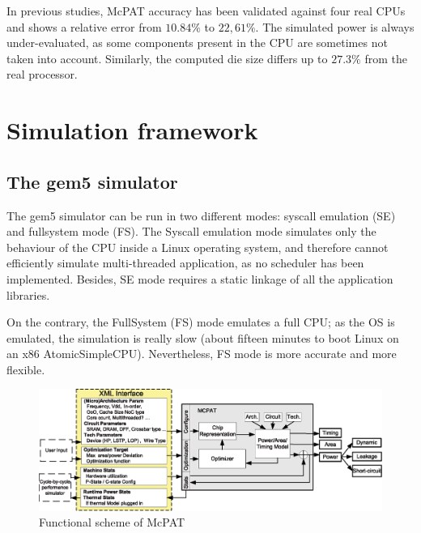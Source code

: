 \documentclass{article}
\begin{document}
\begin{multicols}{2}
In previous studies, McPAT accuracy has been validated against four real CPUs\cite{McPAT} and shows a relative error from $10.84\%$ to $22,61\%$. The simulated power is always under-evaluated, as some components present in the CPU are sometimes not taken into account. Similarly, the computed die size differs up to $27.3\%$ from the real processor.



\section{Simulation framework}
\label{sim}

\subsection{The gem5 simulator}

The gem5 simulator can be run in two different modes: syscall emulation (SE) and fullsystem mode (FS). The Syscall emulation mode simulates only the behaviour of the CPU inside a Linux operating system, and therefore cannot efficiently simulate multi-threaded application, as no scheduler has been implemented. Besides, SE mode requires a static linkage of all the application libraries.

On the contrary, the FullSystem (FS) mode emulates a full CPU; as the OS is emulated, the simulation is really slow (about fifteen minutes to boot Linux on an x86 AtomicSimpleCPU). Nevertheless, FS mode is more accurate and more flexible.

\end{multicols}
\begin{figure}[ht]
\begin{center}
\includegraphics[width=0.9\linewidth]{McPAT_diag.eps}
\caption{\label{McPAT_schema}Functional scheme of McPAT}
\end{center}
\end{figure}

\newpage
\end{document}
